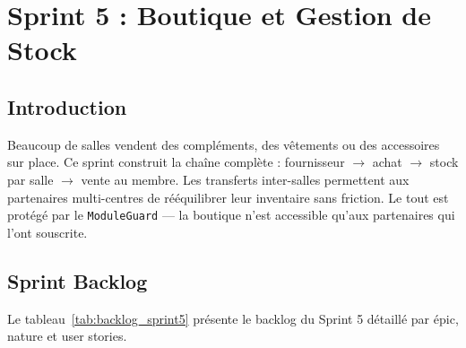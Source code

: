 ﻿\documentclass[../main.tex]{subfiles}
\begin{document}
\chapter{Sprint 5 : Boutique et Gestion de Stock}

\section{Introduction}

Beaucoup de salles vendent des compl\'{e}ments, des v\^{e}tements ou des accessoires sur place. Ce sprint construit la cha\^{i}ne compl\`{e}te : fournisseur $\rightarrow$ achat $\rightarrow$ stock par salle $\rightarrow$ vente au membre. Les transferts inter-salles permettent aux partenaires multi-centres de r\'{e}\'{e}quilibrer leur inventaire sans friction. Le tout est prot\'{e}g\'{e} par le \texttt{ModuleGuard} --- la boutique n'est accessible qu'aux partenaires qui l'ont souscrite.

\section{Sprint Backlog}

Le tableau~\ref{tab:backlog_sprint5} pr\'{e}sente le backlog du Sprint 5 d\'{e}taill\'{e} par \'{e}pic, nature et user stories.
\end{document}
